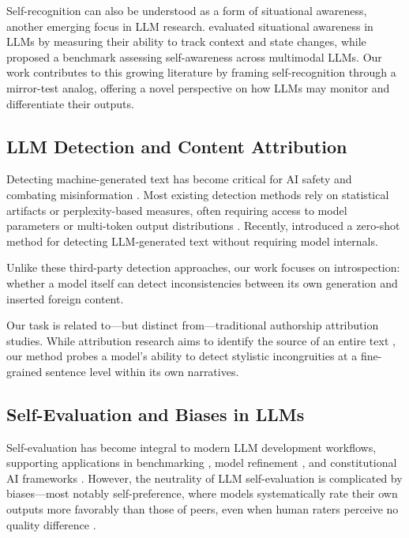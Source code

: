 \documentclass{article}
\begin{document}
Self-recognition can also be understood as a form of situational awareness, another emerging focus in LLM research. \citet{berglund2023taken} evaluated situational awareness in LLMs by measuring their ability to track context and state changes, while \citet{wang2024mm} proposed a benchmark assessing self-awareness across multimodal LLMs. Our work contributes to this growing literature by framing self-recognition through a mirror-test analog, offering a novel perspective on how LLMs may monitor and differentiate their outputs.

\subsection{LLM Detection and Content Attribution}

Detecting machine-generated text has become critical for AI safety and combating misinformation \citep{jawahar2020automatic, wu2025survey, yang2023survey}. Most existing detection methods rely on statistical artifacts or perplexity-based measures, often requiring access to model parameters or multi-token output distributions \citep{mitchell2023detectgpt}. Recently, \citet{hans2024spotting} introduced a zero-shot method for detecting LLM-generated text without requiring model internals.

Unlike these third-party detection approaches, our work focuses on introspection: whether a model itself can detect inconsistencies between its own generation and inserted foreign content. 

Our task is related to—but distinct from—traditional authorship attribution studies. While attribution research aims to identify the source of an entire text \citep{kumarage2024survey}, our method probes a model's ability to detect stylistic incongruities at a fine-grained sentence level within its own narratives.

\subsection{Self-Evaluation and Biases in LLMs}

Self-evaluation has become integral to modern LLM development workflows, supporting applications in benchmarking \citep{zheng2023judging, bai2023benchmarking}, model refinement \citep{madaan2023self, shridhar2023art}, and constitutional AI frameworks \citep{bai2022constitutional}. However, the neutrality of LLM self-evaluation is complicated by biases—most notably self-preference, where models systematically rate their own outputs more favorably than those of peers, even when human raters perceive no quality difference \citep{liu2023llms, koo2023benchmarking}.
\end{document}
